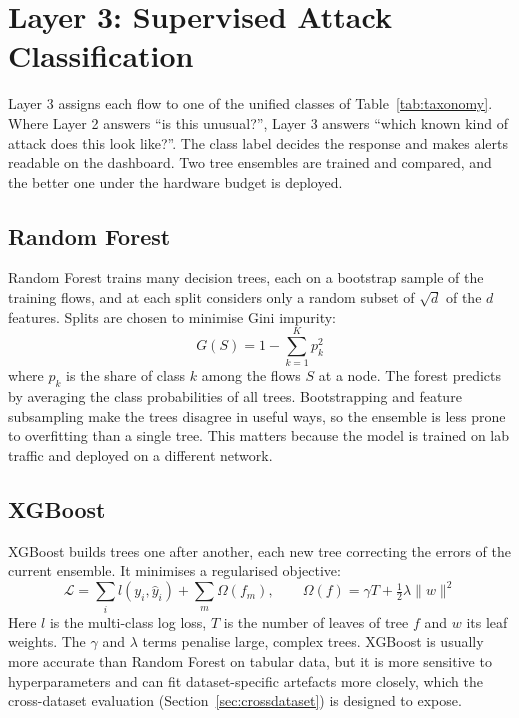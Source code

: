\section{Layer 3: Supervised Attack Classification}\label{sec:5.6}
\label{sec:layer3}
\noindent Layer 3 assigns each flow to one of the unified classes of Table~\ref{tab:taxonomy}. Where Layer 2 answers ``is this unusual?'', Layer 3 answers ``which known kind of attack does this look like?''. The class label decides the response and makes alerts readable on the dashboard. Two tree ensembles are trained and compared, and the better one under the hardware budget is deployed.

\subsection{Random Forest}\label{sec:5.6.1}
\label{sec:rf}
\noindent Random Forest \cite{nidps:rf} trains many decision trees, each on a bootstrap sample of the training flows, and at each split considers only a random subset of $\sqrt{d}$ of the $d$ features. Splits are chosen to minimise Gini impurity:
\begin{equation}
\label{eq:gini}
G(S) = 1 - \sum_{k=1}^{K} p_k^2
\end{equation}
\noindent where $p_k$ is the share of class $k$ among the flows $S$ at a node. The forest predicts by averaging the class probabilities of all trees. Bootstrapping and feature subsampling make the trees disagree in useful ways, so the ensemble is less prone to overfitting than a single tree. This matters because the model is trained on lab traffic and deployed on a different network.

\subsection{XGBoost}\label{sec:5.6.2}
\label{sec:xgb}
\noindent XGBoost \cite{nidps:xgb} builds trees one after another, each new tree correcting the errors of the current ensemble. It minimises a regularised objective:
\begin{equation}
\label{eq:xgb}
\mathcal{L} = \sum_{i} l(y_i, \hat{y}_i) + \sum_{m} \Omega(f_m), \qquad
\Omega(f) = \gamma T + \tfrac{1}{2} \lambda \lVert w \rVert^2
\end{equation}
\noindent Here $l$ is the multi-class log loss, $T$ is the number of leaves of tree $f$ and $w$ its leaf weights. The $\gamma$ and $\lambda$ terms penalise large, complex trees. XGBoost is usually more accurate than Random Forest on tabular data, but it is more sensitive to hyperparameters and can fit dataset-specific artefacts more closely, which the cross-dataset evaluation (Section~\ref{sec:crossdataset}) is designed to expose.

